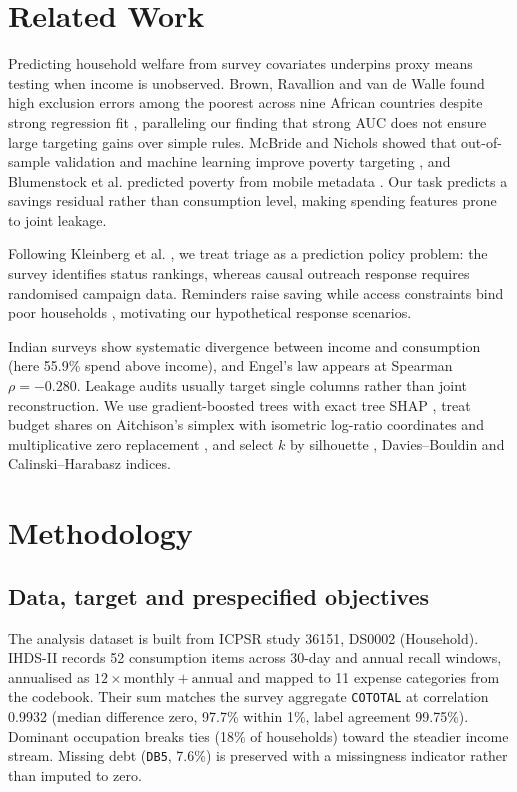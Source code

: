 \documentclass[conference]{IEEEtran}
\begin{document}
\section{Related Work}
\label{sec:related_work}

Predicting household welfare from survey covariates underpins proxy means testing when income is unobserved. Brown, Ravallion and van de Walle found high exclusion errors among the poorest across nine African countries despite strong regression fit \cite{brown2018}, paralleling our finding that strong AUC does not ensure large targeting gains over simple rules. McBride and Nichols showed that out-of-sample validation and machine learning improve poverty targeting \cite{mcbride2018}, and Blumenstock et al. predicted poverty from mobile metadata \cite{blumenstock2015}. Our task predicts a savings residual rather than consumption level, making spending features prone to joint leakage.

Following Kleinberg et al. \cite{kleinberg2015}, we treat triage as a prediction policy problem: the survey identifies status rankings, whereas causal outreach response requires randomised campaign data. Reminders raise saving \cite{karlan2016} while access constraints bind poor households \cite{dupas2013}, motivating our hypothetical response scenarios.

Indian surveys show systematic divergence between income and consumption \cite{deaton2005} (here 55.9\% spend above income), and Engel's law appears at Spearman $\rho = -0.280$. Leakage audits \cite{kaufman2012} usually target single columns rather than joint reconstruction. We use gradient-boosted trees \cite{chen2016} with exact tree SHAP \cite{lundberg2017,lundberg2020}, treat budget shares on Aitchison's simplex \cite{aitchison1982} with isometric log-ratio coordinates \cite{egozcue2003} and multiplicative zero replacement \cite{martinfernandez2003}, and select $k$ by silhouette \cite{rousseeuw1987}, Davies--Bouldin and Calinski--Harabasz indices.

\section{Methodology}

\subsection{Data, target and prespecified objectives}

The analysis dataset is built from ICPSR study 36151, DS0002 (Household). IHDS-II records 52 consumption items across 30-day and annual recall windows, annualised as $12 \times \text{monthly} + \text{annual}$ and mapped to 11 expense categories from the codebook. Their sum matches the survey aggregate \texttt{COTOTAL} at correlation 0.9932 (median difference zero, 97.7\% within 1\%, label agreement 99.75\%). Dominant occupation breaks ties (18\% of households) toward the steadier income stream. Missing debt (\texttt{DB5}, 7.6\%) is preserved with a missingness indicator rather than imputed to zero.
\end{document}
